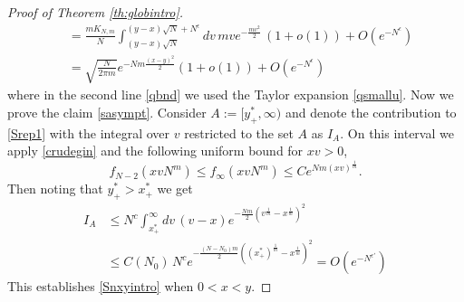 \documentclass[11pt,reqno]{amsproc}
\numberwithin{equation}{section}
\numberwithin{theorem}{section}
\begin{document}
\begin{proof}[Proof of Theorem \ref{th:globintro}]
\begin{align}
&= \frac{mK_{N,m}}{N}\int_{(y-x)\sqrt{N}}^{(y-x)\sqrt{N}+N^{\epsilon}}dv\,mve^{-\frac{mv^{2}}{2}}\,(1+o(1))+O(e^{-N^{\epsilon}}) \label{qbnd}\\
&= \sqrt{\frac{N}{2\pi m}}e^{-Nm\frac{(x-y)^{2}}{2}}(1+o(1))+O(e^{-N^{\epsilon}}) \label{SNest}
\end{align}
where in the second line \eqref{qbnd} we used the Taylor expansion \eqref{qsmallu}. Now we prove the claim \eqref{sasympt}. Consider $A := [y_{+}^{*},\infty)$ and denote the contribution to \eqref{Srep1} with the integral over $v$ restricted to the set $A$ as $I_{A}$. On this interval we apply \eqref{crudegin} and the following uniform bound for $xv>0$, 
\begin{equation}
f_{N-2}(xvN^{m}) \leq f_{\infty}(xvN^{m}) \leq Ce^{Nm(xv)^{\frac{1}{m}}}. \label{fintbnd}
\end{equation}
Then noting that $y^{*}_{+} > x^{*}_{+}$ we get
\begin{equation}
\begin{split}
I_{A} &\leq N^{c}\int_{x^{*}_{+}}^{\infty}dv\,(v-x)e^{-\frac{Nm}{2}(v^{\frac{1}{m}}-x^{\frac{1}{m}})^{2}}\\
&\leq C(N_0)\,N^{c}e^{-\frac{(N-N_{0})m}{2}((x^{*}_{+})^{\frac{1}{m}}-x^{\frac{1}{m}})^{2}} = O(e^{-N^{\epsilon'}})
\end{split}
\end{equation}
This establishes \eqref{Snxyintro} when $0 < x < y$. 


\end{proof}
\end{document}

